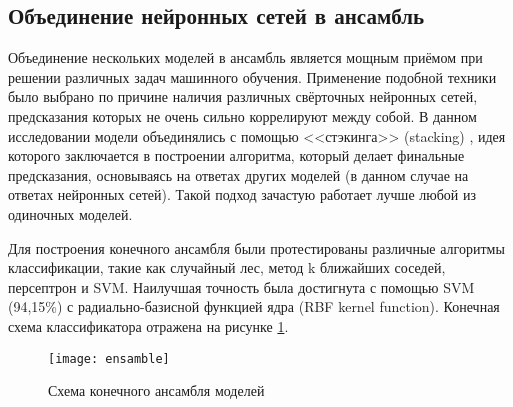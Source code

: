 \subsection{Объединение нейронных сетей в ансамбль}
Объединение нескольких моделей в ансамбль является мощным приёмом при решении различных задач машинного обучения.
Применение подобной техники было выбрано по причине наличия различных свёрточных нейронных сетей, предсказания которых
не очень сильно коррелируют между собой. В данном исследовании модели объединялись с помощью <<стэкинга>> (stacking)
\cite{Wolpert92stackedgeneralization}, идея которого заключается в построении алгоритма, который делает финальные 
предсказания, основываясь на ответах других моделей (в данном случае на ответах нейронных сетей). Такой подход зачастую
работает лучше любой из одиночных моделей.

Для построения конечного ансамбля были протестированы различные алгоритмы классификации, такие как случайный лес, 
метод k ближайших соседей, персептрон и SVM. Наилучшая точность была достигнута с помощью SVM (94,15\%) с радиально-базисной
функцией ядра (RBF kernel function). Конечная схема классификатора отражена на рисунке \ref{fig:ansamble}.

\begin{figure}[H]
    \centering
    \texttt{[image: ensamble]}
    \caption{Схема конечного ансамбля моделей}
    \label{fig:ansamble}
\end{figure}